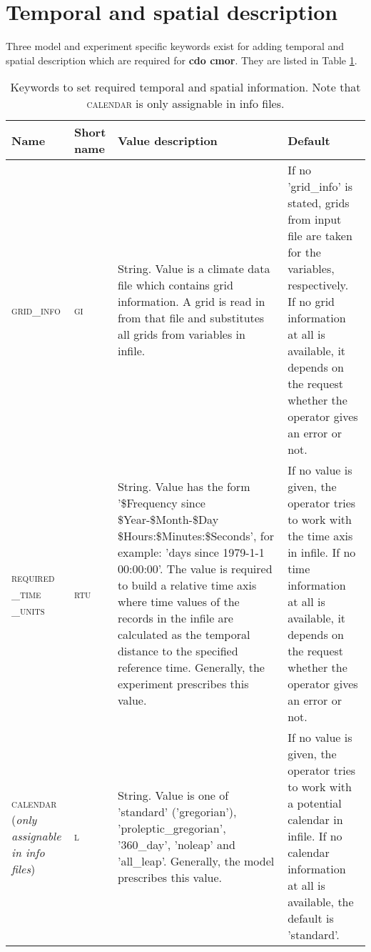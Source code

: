 \section{Temporal and spatial description}

Three model and experiment specific keywords exist for adding temporal and spatial description which are required for \textbf{cdo cmor}. They are listed in Table \ref{table:TempSpat}.

\begin{table}[H]
\caption{Keywords to set required temporal and spatial information. Note that \textsc{calendar} is only assignable in info files.}
\label{table:TempSpat}
\begin{tabular}[H]{|p{2cm}|p{1cm}|p{5.5cm} | p{5.5cm} | }
\hline 
\textbf{Name} & \textbf{Short name} & \textbf{Value description} & \textbf{Default} \\ 
\hline 
\textsc{grid\_info} & \textsc{gi} & String. Value is a climate data file which contains grid information. A grid is read in from that file and substitutes all grids from variables in infile. & If no 'grid\_info' is stated, grids from input file are taken for the variables, respectively. If no grid information at all is available, it depends on the request whether the operator gives an error or not.\\ 
\hline 
\textsc{required
\_time
\_units} & \textsc{rtu} & String. Value has the form '\$Frequency since \$Year-\$Month-\$Day \$Hours:\$Minutes:\$Seconds', for example: 'days since 1979-1-1 00:00:00'. The value is required to build a relative time axis where time values of the records in the infile are calculated as the temporal distance to the specified reference time. Generally, the experiment prescribes this value. & If no value is given, the operator tries to work with the time axis in infile. If no time information at all is available, it depends on the request whether the operator gives an error or not. \\ 
\hline 
\textsc{calendar} (\textit{only assignable in info files})& \textsc{l} & String. Value is one of 'standard' ('gregorian'), 'proleptic\_gregorian', '360\_day', 'noleap' and 'all\_leap'. Generally, the model prescribes this value. & If no value is given, the operator tries to work with a potential calendar in infile. If no calendar information at all is available, the default is 'standard'. \\ 
\hline
\end{tabular} 
\end{table}


